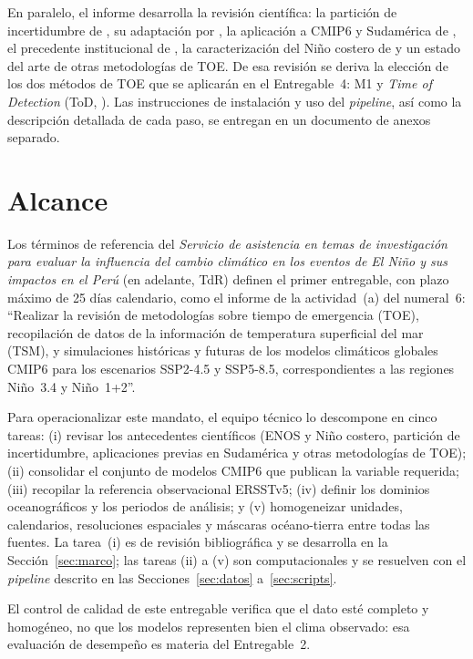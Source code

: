 En paralelo, el informe desarrolla la revisión científica: la partición de incertidumbre de \citet{hawkins2012}, su adaptación por \citet{szabo2016}, la aplicación a CMIP6 y Sudamérica de \citet{bruno2023}, el precedente institucional de \citet{alvarez2024}, la caracterización del Niño costero de \citet{takahashi2019} y un estado del arte de otras metodologías de TOE. De esa revisión se deriva la elección de los dos métodos de TOE que se aplicarán en el Entregable~4: M1 \citep{szabo2016} y \emph{Time of Detection} (ToD, \citealp{gopika2024}). Las instrucciones de instalación y uso del \emph{pipeline}, así como la descripción detallada de cada paso, se entregan en un documento de anexos separado.

\section{Alcance}
\label{sec:alcance}

Los términos de referencia del \emph{Servicio de asistencia en temas de investigación para evaluar la influencia del cambio climático en los eventos de El Niño y sus impactos en el Perú} (en adelante, TdR) definen el primer entregable, con plazo máximo de 25 días calendario, como el informe de la actividad~(a) del numeral~6: ``Realizar la revisión de metodologías sobre tiempo de emergencia (TOE), recopilación de datos de la información de temperatura superficial del mar (TSM), y simulaciones históricas y futuras de los modelos climáticos globales CMIP6 para los escenarios SSP2-4.5 y SSP5-8.5, correspondientes a las regiones Niño~3.4 y Niño~1+2''.

Para operacionalizar este mandato, el equipo técnico lo descompone en cinco tareas: (i) revisar los antecedentes científicos (ENOS y Niño costero, partición de incertidumbre, aplicaciones previas en Sudamérica y otras metodologías de TOE); (ii) consolidar el conjunto de modelos CMIP6 que publican la variable requerida; (iii) recopilar la referencia observacional ERSSTv5; (iv) definir los dominios oceanográficos y los periodos de análisis; y (v) homogeneizar unidades, calendarios, resoluciones espaciales y máscaras océano-tierra entre todas las fuentes. La tarea~(i) es de revisión bibliográfica y se desarrolla en la Sección~\ref{sec:marco}; las tareas (ii) a (v) son computacionales y se resuelven con el \emph{pipeline} descrito en las Secciones~\ref{sec:datos} a~\ref{sec:scripts}.

El control de calidad de este entregable verifica que el dato esté completo y homogéneo, no que los modelos representen bien el clima observado: esa evaluación de desempeño es materia del Entregable~2.
